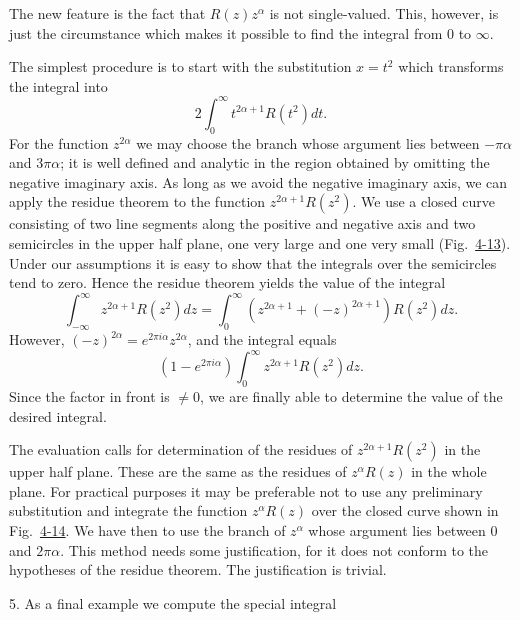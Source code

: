 The new feature is the fact that $R(z)z^{\alpha}$ is not single-valued. This, however, is just the circumstance which makes it possible to find the integral from 0 to $\infty$.

The simplest procedure is to start with the substitution $x = t^{2}$ which transforms the integral into
\begin{equation*}
2 \int_ {0} ^ {\infty} t ^ {2 \alpha + 1} R (t ^ {2}) d t.
\end{equation*}
For the function $z^{2\alpha}$ we may choose the branch whose argument lies between $-\pi\alpha$ and $3\pi\alpha$; it is well defined and analytic in the region obtained by omitting the negative imaginary axis. As long as we avoid the negative imaginary axis, we can apply the residue theorem to the function $z^{2\alpha+1}R(z^{2})$. We use a closed curve consisting of two line segments along the positive and negative axis and two semicircles in the upper half plane, one very large and one very small (Fig.~\hyperref[fig:4-13]{4-13}). Under our assumptions it is easy to show that the integrals over the semicircles tend to zero. Hence the residue theorem yields the value of the integral
\begin{equation*}
\int_ {- \infty} ^ {\infty} z ^ {2 \alpha + 1} R (z ^ {2}) d z = \int_ {0} ^ {\infty} (z ^ {2 \alpha + 1} + (- z) ^ {2 \alpha + 1}) R (z ^ {2}) d z.
\end{equation*}
However, $(-z)^{2\alpha} = e^{2\pi i\alpha}z^{2\alpha}$, and the integral equals
\begin{equation*}
(1 - e ^ {2 \pi i \alpha}) \int_ {0} ^ {\infty} z ^ {2 \alpha + 1} R (z ^ {2}) d z.
\end{equation*}
Since the factor in front is $\neq0$, we are finally able to determine the value of the desired integral.

The evaluation calls for determination of the residues of $z^{2\alpha+1}R(z^{2})$ in the upper half plane. These are the same as the residues of $z^{\alpha}R(z)$ in the whole plane. For practical purposes it may be preferable not to use any preliminary substitution and integrate the function $z^{\alpha}R(z)$ over the closed curve shown in Fig.~\hyperref[fig:4-14]{4-14}. We have then to use the branch of $z^{\alpha}$ whose argument lies between 0 and $2\pi\alpha$. This method needs some justification, for it does not conform to the hypotheses of the residue theorem. The justification is trivial.


5. As a final example we compute the special integral

